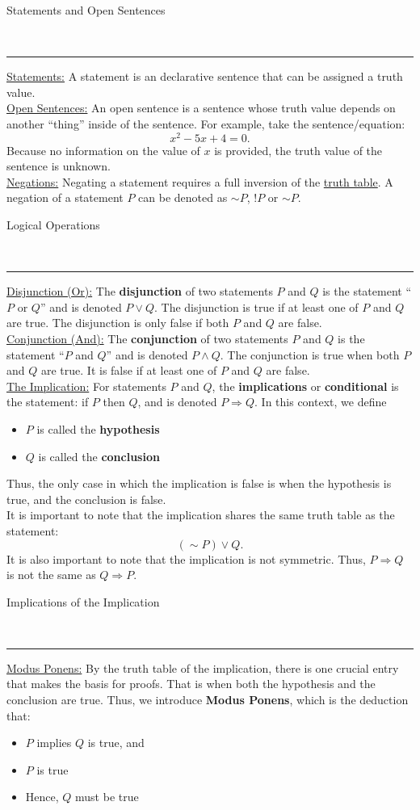 \documentclass{article}
\renewcommand{\neg}{\sim}
\newcommand{\header}[1]{\begin{large}\noindent #1\end{large}\\\rule{\textwidth}{0.5pt}}
\newcommand{\gap}{\medskip\\}
\newcommand{\sheader}[1]{\underline{#1:}}
\newcommand{\sgap}{\smallskip\\}
\begin{document}
\header{Statements and Open Sentences}
\sheader{Statements} A statement is an declarative sentence that can be assigned a truth value.
\gap
\sheader{Open Sentences} An open sentence is a sentence whose truth value depends on another 
``thing'' inside of the sentence. For example, take the sentence/equation:
\[
    x^2 -5x + 4 = 0.
\]
Because no information on the value of $x$ is provided, the truth value of the sentence is unknown.
\gap
\sheader{Negations} Negating a statement requires a full inversion of the \underline{truth table}. 
A negation of a statement $P$ can be denoted as $\sim P$, $!P$ or $\neg P$.
\gap
\header{Logical Operations}
\sheader{Disjunction (Or)} The \textbf{disjunction} of two statements $P$ and $Q$ is 
the statement ``$P$ or $Q$'' and is denoted $P \vee Q$. The disjunction is true if 
at least one of $P$ and $Q$ are true. The disjunction is only false if both $P$ and $Q$ are false.
\sgap
\sheader{Conjunction (And)} The \textbf{conjunction} of two statements $P$ and $Q$ is 
the statement ``$P$ and $Q$'' and is denoted $P \wedge Q$. The conjunction is true when both
$P$ and $Q$ are true. It is false if at least one of $P$ and $Q$ are false.
\gap
\sheader{The Implication} For statements $P$ and $Q$, the \textbf{implications} or \textbf{conditional}
is the statement: if $P$ then $Q$, and is denoted $P \Rightarrow Q$. In this context, we define
\begin{itemize}
    \item $P$ is called the \textbf{hypothesis}
    \item $Q$ is called the \textbf{conclusion}
\end{itemize}
Thus, the only case in which the implication is false is when the hypothesis is true, and
the conclusion is false.
\gap
It is important to note that the implication shares the same truth table as the statement:
\[
    (\sim P) \vee Q .
\]
It is also important to note that the implication is not symmetric. Thus, $P \Rightarrow Q$
is not the same as $Q \Rightarrow P$.
\gap
\header{Implications of the Implication}
\sheader{Modus Ponens} By the truth table of the implication, there is one crucial entry
that makes the basis for proofs. That is when both the hypothesis and the conclusion are true.
Thus, we introduce \textbf{Modus Ponens}, which is the deduction that:
\begin{itemize}
    \item $P$ implies $Q$ is true, and
    \item $P$ is true
    \item Hence, $Q$ must be true
\end{itemize}
\end{document}

